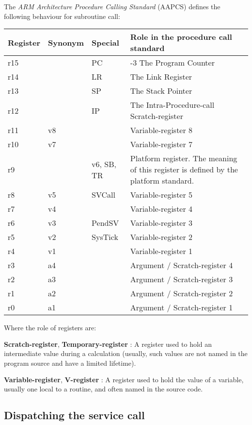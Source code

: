 The \textit{ARM Architecture Procedure Calling Standard} (AAPCS) defines the following behaviour for subroutine call:
\begin{longtable}[c]{l l l p{5cm}}
\toprule
{\bf Register} & {\bf Synonym} & {\bf Special} & {\bf Role in the procedure call standard} \\
\midrule
r15 & & PC & -3 The Program Counter \\
\hline
r14 & & LR & The Link Register \\
\hline
r13 & & SP & The Stack Pointer \\
\hline
r12 & & IP & The Intra-Procedure-call Scratch-register \\
\hline
r11 & v8 & & Variable-register 8 \\
\hline
r10 & v7 & & Variable-register 7 \\
\hline
r9 & & v6, SB, TR & Platform register. The meaning of this register is defined by the platform standard. \\
\hline
r8 & v5 & SVCall & Variable-register 5 \\
\hline
r7 & v4 & & Variable-register 4 \\
\hline
r6 & v3 & PendSV & Variable-register 3 \\
\hline
r5 & v2 & SysTick & Variable-register 2 \\
\hline
r4 & v1 & & Variable-register 1 \\
\hline
r3 & a4 & & Argument / Scratch-register 4 \\
\hline
r2 & a3 & & Argument / Scratch-register 3 \\
\hline
r1 & a2 & & Argument / Scratch-register 2 \\
\hline
r0 & a1 & & Argument / Scratch-register 1 \\
\bottomrule
\end{longtable}

Where the role of registers are:
\begin{penum}
\item \textbf{Scratch-register}, \textbf{Temporary-register} : A register used to hold an intermediate value during a calculation (usually, such values are not named in the program source and have a limited lifetime).
\item \textbf{Variable-register}, \textbf{V-register} : A register used to hold the value of a variable, usually one local to a routine, and often named in the source code.
\end{penum}

\subsection{Dispatching the service call}

